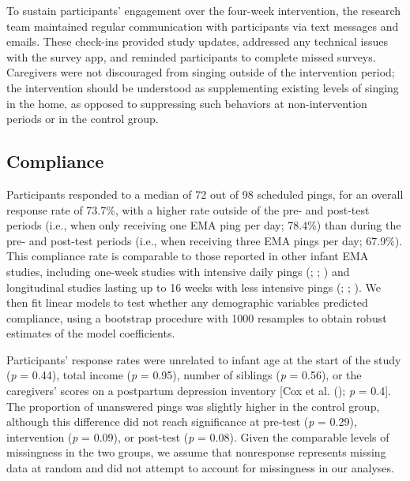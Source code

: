 \documentclass[
]{article}
\begin{document}
To sustain participants' engagement over the four-week intervention, the
research team maintained regular communication with participants via
text messages and emails. These check-ins provided study updates,
addressed any technical issues with the survey app, and reminded
participants to complete missed surveys. Caregivers were not discouraged
from singing outside of the intervention period; the intervention should
be understood as supplementing existing levels of singing in the home,
as opposed to suppressing such behaviors at non-intervention periods or
in the control group.

\subsection{Compliance}\label{compliance}

Participants responded to a median of 72 out of 98 scheduled pings, for
an overall response rate of 73.7\%, with a higher rate outside of the
pre- and post-test periods (i.e., when only receiving one EMA ping per
day; 78.4\%) than during the pre- and post-test periods (i.e., when
receiving three EMA pings per day; 67.9\%). This compliance rate is
comparable to those reported in other infant EMA studies, including
one-week studies with intensive daily pings
(;
;
) and longitudinal studies
lasting up to 16 weeks with less intensive pings
(;
;
). We then fit linear
models to test whether any demographic variables predicted compliance,
using a bootstrap procedure with 1000 resamples to obtain robust
estimates of the model coefficients.

Participants' response rates were unrelated to infant age at the start
of the study (\emph{p} = 0.44), total income (\emph{p} = 0.95), number
of siblings (\emph{p} = 0.56), or the caregivers' scores on a postpartum
depression inventory {[}Cox et al. ();
\emph{p} = 0.4{]}. The proportion of unanswered pings was slightly
higher in the control group, although this difference did not reach
significance at pre-test (\emph{p} = 0.29), intervention (\emph{p} =
0.09), or post-test (\emph{p} = 0.08). Given the comparable levels of
missingness in the two groups, we assume that nonresponse represents
missing data at random and did not attempt to account for missingness in
our analyses.
\end{document}
